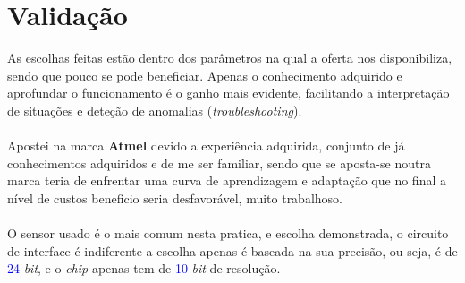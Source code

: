 \section{Validação}
As escolhas feitas estão dentro dos parâmetros na qual a oferta nos disponibiliza, sendo que pouco se pode beneficiar. Apenas o conhecimento adquirido e aprofundar o funcionamento é o ganho mais evidente, facilitando a interpretação de situações e deteção de anomalias (\textit{troubleshooting}).\\
\\
Apostei na marca \textbf{Atmel} devido a experiência adquirida, conjunto de já conhecimentos adquiridos e de me ser familiar, sendo que se aposta-se noutra marca teria de enfrentar uma curva de aprendizagem e adaptação que no final a nível de custos beneficio seria desfavorável, muito trabalhoso.\\
\\
O sensor usado é o mais comum nesta pratica, e escolha demonstrada, o circuito de interface é indiferente a escolha apenas é baseada na sua precisão, ou seja, é de \textcolor{blue}{24} \textit{bit}, e o \textit{chip} apenas tem  de \textcolor{blue}{10} \textit{bit} de resolução.

